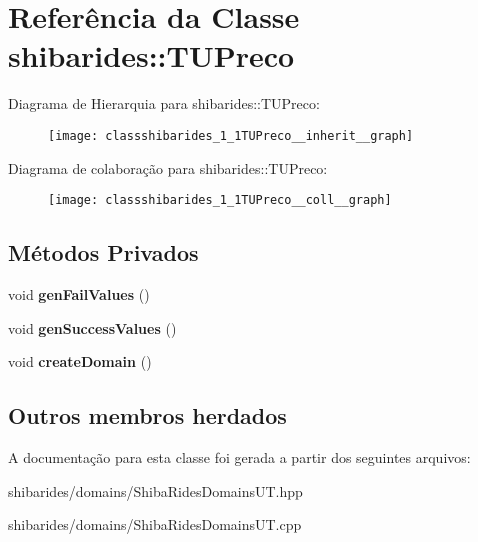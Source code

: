 \hypertarget{classshibarides_1_1TUPreco}{}\section{Referência da Classe shibarides\+:\+:T\+U\+Preco}
\label{classshibarides_1_1TUPreco}


Diagrama de Hierarquia para shibarides\+:\+:T\+U\+Preco\+:\nopagebreak
\begin{figure}[H]
\begin{center}
\leavevmode
\texttt{[image: classshibarides\_1\_1TUPreco\_\_inherit\_\_graph]}
\end{center}
\end{figure}


Diagrama de colaboração para shibarides\+:\+:T\+U\+Preco\+:\nopagebreak
\begin{figure}[H]
\begin{center}
\leavevmode
\texttt{[image: classshibarides\_1\_1TUPreco\_\_coll\_\_graph]}
\end{center}
\end{figure}
\subsection*{Métodos Privados}
\begin{DoxyCompactItemize}
\item 
void {\bfseries gen\+Fail\+Values} ()\hypertarget{classshibarides_1_1TUPreco_a76bae658ac461a4a781a9967bb28b57a}{}\label{classshibarides_1_1TUPreco_a76bae658ac461a4a781a9967bb28b57a}

\item 
void {\bfseries gen\+Success\+Values} ()\hypertarget{classshibarides_1_1TUPreco_a6bf47d478080acf75e66df5128ff2a06}{}\label{classshibarides_1_1TUPreco_a6bf47d478080acf75e66df5128ff2a06}

\item 
void {\bfseries create\+Domain} ()\hypertarget{classshibarides_1_1TUPreco_a1b05bbbaad5fb145dd5373242f6b4cc8}{}\label{classshibarides_1_1TUPreco_a1b05bbbaad5fb145dd5373242f6b4cc8}

\end{DoxyCompactItemize}
\subsection*{Outros membros herdados}


A documentação para esta classe foi gerada a partir dos seguintes arquivos\+:\begin{DoxyCompactItemize}
\item 
shibarides/domains/Shiba\+Rides\+Domains\+U\+T.\+hpp\item 
shibarides/domains/Shiba\+Rides\+Domains\+U\+T.\+cpp\end{DoxyCompactItemize}
